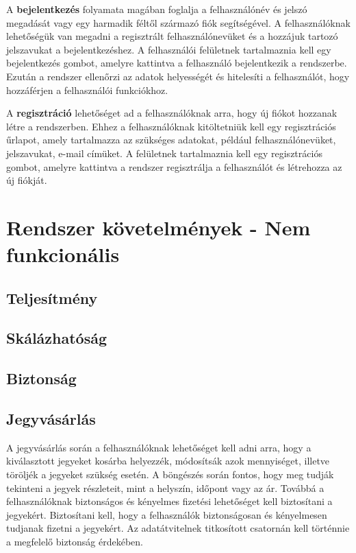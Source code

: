 \begin{itemize}
A \textbf{bejelentkezés} folyamata magában foglalja a felhasználónév és jelszó megadását vagy egy harmadik féltől származó fiók segítségével. A felhasználóknak lehetőségük van megadni a regisztrált felhasználónevüket és a hozzájuk tartozó jelszavukat a bejelentkezéshez. A felhasználói felületnek tartalmaznia kell egy bejelentkezés gombot, amelyre kattintva a felhasználó bejelentkezik a rendszerbe. Ezután a rendszer ellenőrzi az adatok helyességét és hitelesíti a felhasználót, hogy hozzáférjen a felhasználói funkciókhoz.

A \textbf{regisztráció} lehetőséget ad a felhasználóknak arra, hogy új fiókot hozzanak létre a rendszerben. Ehhez a felhasználóknak kitöltetniük kell egy regisztrációs űrlapot, amely tartalmazza az szükséges adatokat, például felhasználónevüket, jelszavukat, e-mail címüket. A felületnek tartalmaznia kell egy regisztrációs gombot, amelyre kattintva a rendszer regisztrálja a felhasználót és létrehozza az új fiókját.
\end{itemize}


\pagebreak



\section {Rendszer követelmények - Nem funkcionális}
\subsection {Teljesítmény}

\subsection {Skálázhatóság}

\subsection {Biztonság}

\subsection {Jegyvásárlás}

A jegyvásárlás során a felhasználóknak lehetőséget kell adni arra, hogy a kiválasztott jegyeket kosárba helyezzék, módosítsák azok mennyiséget, illetve töröljék a jegyeket szükség esetén. A böngészés során fontos, hogy meg tudják tekinteni a jegyek részleteit, mint a helyszín, időpont vagy az ár. Továbbá a felhasználóknak biztonságos és kényelmes fizetési lehetőséget kell biztosítani a jegyekért.
Biztosítani kell, hogy a felhasználók biztonságosan és kényelmesen tudjanak fizetni a jegyekért. Az adatátvitelnek titkosított csatornán kell történnie a megfelelő biztonság érdekében.

